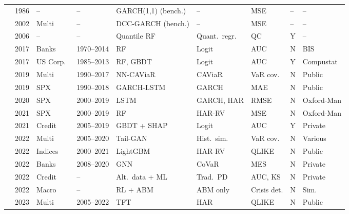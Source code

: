 \begin{longtable}{p{2.4cm} p{0.6cm} p{1.0cm} p{1.0cm} p{2.0cm} p{1.5cm} p{1.3cm} p{0.7cm} p{1.3cm}}
\citet{Bollerslev1986} & 1986 & --     & --         & GARCH(1,1) (bench.) & --              & MSE          & -- & --     \\
\citet{Engle2002}      & 2002 & Multi  & --         & DCC-GARCH (bench.)  & --              & MSE          & -- & --     \\
\citet{Meinshausen2006}& 2006 & --     & --         & Quantile RF       & Quant.\ regr.    & QC           & Y & --     \\
\citet{Holopainen2017} & 2017 & Banks  & 1970--2014 & RF                & Logit            & AUC          & N & BIS    \\
\citet{Barboza2017}    & 2017 & US Corp.\ & 1985--2013 & RF, GBDT       & Logit            & AUC          & Y & Compustat \\
\citet{Taylor2019}     & 2019 & Multi  & 1990--2017 & NN-CAViaR         & CAViaR           & VaR cov.\    & N & Public \\
\citet{Zhang2019}      & 2019 & SPX    & 1990--2018 & GARCH-LSTM        & GARCH            & MAE          & N & Public \\
\citet{Bucci2020}      & 2020 & SPX    & 2000--2019 & LSTM              & GARCH, HAR       & RMSE         & N & Oxford-Man \\
\citet{Luong2021}      & 2021 & SPX    & 2000--2019 & RF                & HAR-RV           & MSE          & N & Oxford-Man \\
\citet{Bussmann2021}   & 2021 & Credit & 2005--2019 & GBDT + SHAP       & Logit            & AUC          & Y & Private \\
\citet{Cont2022}       & 2022 & Multi  & 2005--2020 & Tail-GAN          & Hist.\ sim.\     & VaR cov.\    & N & Various \\
\citet{Mittnik2022}    & 2022 & Indices& 2000--2021 & LightGBM          & HAR-RV           & QLIKE        & N & Public \\
\citet{Giudici2022}    & 2022 & Banks  & 2008--2020 & GNN               & CoVaR            & MES          & N & Private \\
\citet{Suss2022}       & 2022 & Credit & --         & Alt.\ data + ML   & Trad.\ PD        & AUC, KS      & N & Private \\
\citet{Delli2022}      & 2022 & Macro  & --         & RL + ABM          & ABM only         & Crisis det.  & N & Sim.   \\
\citet{Christensen2023}& 2023 & Multi  & 2005--2022 & TFT               & HAR              & QLIKE        & N & Public \\

\end{longtable}

